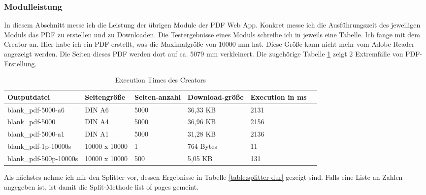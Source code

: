 \subsubsection{Modulleistung}
In diesem Abschnitt messe ich die Leistung der übrigen Module der PDF Web App. Konkret messe ich die Ausführungszeit des jeweiligen Moduls das PDF zu erstellen und zu Downloaden. Die Testergebnisse eines Moduls schreibe ich in jeweils eine Tabelle. Ich fange mit dem Creator an. Hier habe ich ein PDF erstellt, was die Maximalgröße von 10000 mm hat. Diese Größe kann nicht mehr vom Adobe Reader angezeigt werden. Die Seiten dieses PDF werden dort auf ca. 5079 mm verkleinert. Die zugehörige Tabelle \ref{table:creator-dur} zeigt 2 Extremfälle von PDF-Erstellung.

\begin{table}[!htbp]
	\centering
	\begin{tabular}{|p{3cm}|p{3cm}|p{2cm}|p{2cm}|p{2cm}|p{2cm}|}
		\hline
		\textbf{Outputdatei}						& \textbf{Seitengröße}	& \textbf{Seiten-anzahl}	& \textbf{Download-größe}	& \textbf{Execution in ms} 	\\ 
		\hline
		blank\_pdf-5000-a6							& DIN A6 				& 5000 						& 36,33 KB 					& 2131  					\\
		blank\_pdf-5000								& DIN A4 				& 5000 						& 36,96 KB 					& 2156   					\\
		blank\_pdf-5000-a1							& DIN A1 				& 5000 						& 31,28 KB 					& 2136   					\\
		blank\_pdf-1p-10000s						& 10000 x 10000			& 1 						& 764 Bytes					& 11						\\	
		blank\_pdf-500p-10000s						& 10000 x 10000			& 500 						& 5,05 KB					& 131						\\	
		\hline
	\end{tabular}
	\caption{Execution Times des Creators}
	\label{table:creator-dur}
\end{table}

Als nächstes nehme ich mir den Splitter vor, dessen Ergebnisse in Tabelle \ref{table:splitter-dur} gezeigt sind. Falls eine Liste an Zahlen angegeben ist, ist damit die Split-Methode list of pages gemeint.

